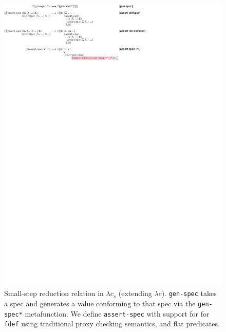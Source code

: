 \begin{figure}
  \includegraphics[]{redex/arrowvspec.pdf}
\caption{Small-step reduction relation in $\lambda c_s$ (extending $\lambda c$).
  \texttt{gen-spec} takes a spec and generates a value conforming to that spec
  via the \texttt{gen-spec*} metafunction.
  We define \texttt{assert-spec} with support for 
for \texttt{fdef} using traditional proxy checking semantics, and flat predicates.}
  \label{arrowvspec}
\end{figure}

